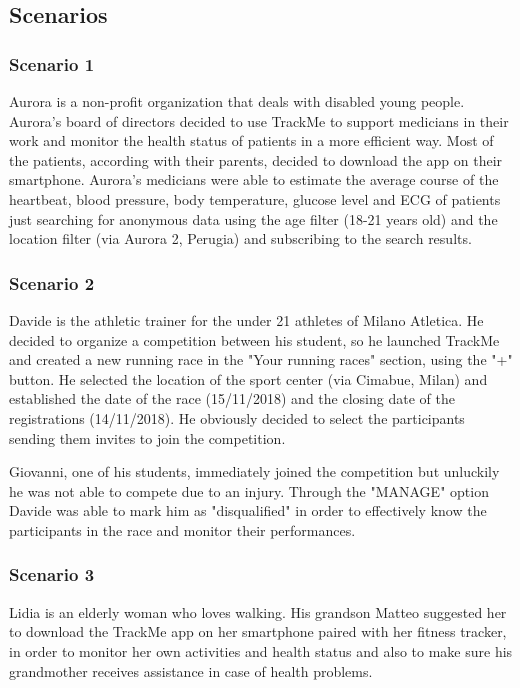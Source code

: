 \subsection{Scenarios}
\subsubsection{Scenario 1}
Aurora is a non-profit organization that deals with disabled young people. Aurora's board of directors decided to use TrackMe to support medicians in their work and monitor the health status of patients in a more efficient way. Most of the patients, according with their parents, decided to download the app on their smartphone. Aurora's medicians were able to estimate the average course of the heartbeat, blood pressure, body temperature, glucose level and ECG of patients just searching for anonymous data using the age filter (18-21 years old) and the location filter (via Aurora 2, Perugia) and subscribing to the search results.

\subsubsection{Scenario 2}
Davide is the athletic trainer for the under 21 athletes of Milano Atletica. He decided to organize a competition between his student, so he launched TrackMe and created a new running race in the "Your running races" section, using the "+" button. He selected the location of the sport center (via Cimabue, Milan) and established the date of the race (15/11/2018) and the closing date of the registrations (14/11/2018). He obviously decided to select the participants sending them invites to join the competition.

Giovanni, one of his students, immediately joined the competition but unluckily he was not able to compete due to an injury. Through the "MANAGE" option Davide was able to mark him as "disqualified" in order to effectively know the participants in the race and monitor their performances.

\subsubsection{Scenario 3}
Lidia is an elderly woman who loves walking. His grandson Matteo suggested her to download the TrackMe app on her smartphone paired with her fitness tracker, in order to monitor her own activities and health status and also to make sure his grandmother receives assistance in case of health problems.

